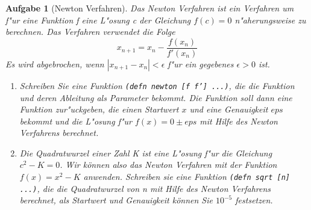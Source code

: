 \documentclass[11pt,a4paper]{article}
\newcounter{numb}
\theoremstyle{break}
\newtheorem{aufgabe}{Aufgabe}[numb]
\begin{document}
\begin{aufgabe}[Newton Verfahren]
Das Newton Verfahren ist ein Verfahren um f"ur eine Funktion f eine L"osung c der Gleichung $f(c)=0$  n"aherungsweise zu berechnen.
Das Verfahren verwendet die Folge $$x_{n+1} = x_{n} - \frac{f(x_n)}{f'(x_n)}$$ 
Es wird abgebrochen, wenn $|x_{n+1} - x_n| < \epsilon$ f"ur ein gegebenes $\epsilon > 0$ ist.

\begin{enumerate}[label=\alph*)]

  \item Schreiben Sie eine Funktion \texttt{(defn newton [f f'] ...)}, die die Funktion und deren Ableitung als Parameter bekommt. Die Funktion soll dann eine Funktion zur"uckgeben, die einen Startwert $x$ und eine Genauigkeit $eps$ bekommt und die L"osung f"ur $f(x)=0 \pm eps$ mit Hilfe des Newton Verfahrens berechnet. 
  
    \item Die Quadratwurzel einer Zahl K ist eine L"osung f"ur die Gleichung $c^2 - K = 0$. Wir k\"onnen also das Newton Verfahren mit der Funktion $f(x) = x^2 - K$ anwenden. Schreiben sie eine Funktion \texttt{(defn sqrt [n] ...)}, die die Quadratwurzel von n mit Hilfe des Newton Verfahrens berechnet, als Startwert und Genauigkeit k\"onnen Sie $10^{-5}$ festsetzen.
    

\end{enumerate}
\end{aufgabe}
\end{document}
